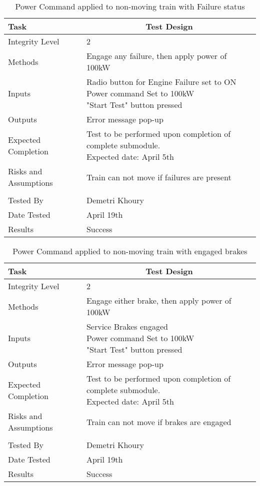 \documentclass[]{article}
\begin{document}
	\begin{table}[H]
		\centering
		\caption{Power Command applied to non-moving train with Failure status}
		\begin{tabular}{|l|l|}
			\hline
			Task & \multicolumn{1}{c|}{Test Design} \\ \hline
			Integrity Level & 2 \\ \hline
			Methods & Engage any failure, then apply power of 100kW  \\ \hline
			Inputs &  \parbox[t]{10cm}{Radio button for Engine Failure set to ON\\ Power command Set to 100kW\\ "Start Test" button pressed }\\ \hline
			Outputs & Error message pop-up\\ \hline
			Expected Completion & \parbox[t]{10cm}{Test to be performed upon completion of complete submodule.\\ Expected date: April 5th}\\ \hline
			Risks and Assumptions & Train can not move if failures are present\\ \hline
			\\ \hline
			Tested By   &  Demetri Khoury\\	\hline
			Date Tested & \parbox[t]{10cm}{April 19th}\\ \hline
			Results & Success\\ \hline
		\end{tabular}
	\end{table}

	\begin{table}[H]
		\centering
		\caption{Power Command applied to non-moving train with engaged brakes}
		\begin{tabular}{|l|l|}
			\hline
			Task & \multicolumn{1}{c|}{Test Design} \\ \hline
			Integrity Level & 2 \\ \hline
			Methods & Engage either brake, then apply power of 100kW  \\ \hline
			Inputs &  \parbox[t]{10cm}{Service Brakes engaged\\ Power command Set to 100kW\\ "Start Test" button pressed }\\ \hline
			Outputs & Error message pop-up\\ \hline
			Expected Completion & \parbox[t]{10cm}{Test to be performed upon completion of complete submodule.\\ Expected date: April 5th}\\ \hline
			Risks and Assumptions & Train can not move if brakes are engaged\\ \hline
			\\ \hline
			Tested By   &  Demetri Khoury\\	\hline
			Date Tested & \parbox[t]{10cm}{April 19th}\\ \hline
			Results & Success\\ \hline
		\end{tabular}
	\end{table}
\end{document}
